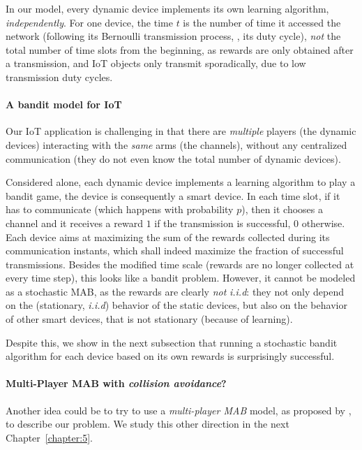In our model, every dynamic device implements its own learning algorithm, \emph{independently}.
For one device, the time $t$ is the number of time it accessed the network (following its Bernoulli transmission process, \ie, its duty cycle), \emph{not} the total number of time slots from the beginning, as rewards are only obtained after a transmission, and IoT objects only transmit sporadically, due to low transmission duty cycles.


\paragraph{A bandit model for IoT}
%
Our IoT application is challenging in that there are \emph{multiple} players (the dynamic devices) interacting with the \emph{same} arms (the channels), without any centralized communication (they do not even know the total number of dynamic devices).

Considered alone, each dynamic device implements a learning algorithm to play a bandit game, the device is consequently a smart device. In each time slot, if it has to communicate (which happens with probability $p$), then it chooses a channel and it receives a reward $1$ if the transmission is successful, $0$ otherwise.
Each device aims at maximizing the sum of the rewards collected during its communication instants, which shall indeed maximize the fraction of successful transmissions. Besides the modified time scale (rewards are no longer collected at every time step), this looks like a bandit problem.
However, it cannot be modeled as a stochastic MAB, as the rewards are clearly \emph{not} \emph{i.i.d}: they not only depend on the (stationary, \emph{i.i.d}) behavior of the static devices, but also on the behavior of other smart devices, that is not stationary (because of learning).

Despite this, we show in the next subsection that running a stochastic bandit algorithm for each device based on its own rewards is surprisingly successful.


\paragraph{Multi-Player MAB with \emph{collision avoidance}?}
%
Another idea could be to try to use a \emph{multi-player MAB} model, as proposed by \cite{Zhao10}, to describe our problem.
We study this other direction in the next Chapter~\ref{chapter:5}.


